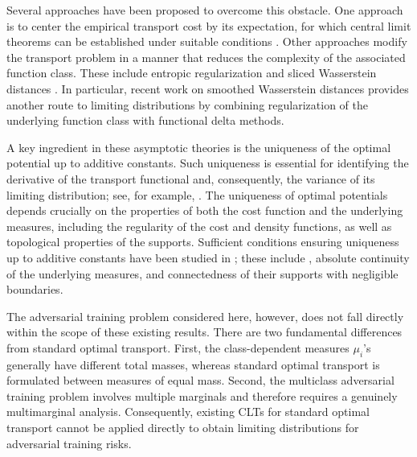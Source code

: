 \documentclass{amsart}
\theoremstyle{plain}
\numberwithin{equation}{section}\newtheorem{theorem}{Theorem}[section]
\theoremstyle{remark}
\begin{document}
Several approaches have been proposed to overcome this obstacle. One approach is to center the empirical transport cost by its expectation, for which central limit theorems can be established under suitable conditions \cite{CLT_OT2019, CLT_general_transport2024, Hundrieser_etc2024}. Other approaches modify the transport problem in a manner that reduces the complexity of the associated function class. These include entropic regularization \cite{CLT_EOT_finite, CLT_general_cost_OT, gonzalezsanz2024weaklimitsentropyregularized, gonzalezsanz2023weaklimitsempiricalentropic, lower_complexity_EOT, limit_distribution_EOT, samplecomplexity_EOT} and sliced Wasserstein distances \cite{Okano_Imaizumi2024, Goldfeld_Kato_Rioux_Sadhu2024, rodriguezvitores2025improvedcentrallimittheorem}. In particular, recent work on smoothed Wasserstein distances \cite{limit_pWasserstein2024, Goldfeld_Kato_Rioux_Sadhu2024} provides another route to limiting distributions by combining regularization of the underlying function class with functional delta methods.





A key ingredient in these asymptotic theories is the uniqueness of the optimal potential up to additive constants. Such uniqueness is essential for identifying the derivative of the transport functional and, consequently, the variance of its limiting distribution; see, for example, \cite{CLT_OT2019, Goldfeld_Kato_Rioux_Sadhu2024, CLT_general_transport2024}. The uniqueness of optimal potentials depends crucially on the properties of both the cost function and the underlying measures, including the regularity of the cost and density functions, as well as topological properties of the supports. Sufficient conditions ensuring uniqueness up to additive constants have been studied in \cite{CLT_OT2019, CLT_general_transport2024}; these include , absolute continuity of the underlying measures, and connectedness of their supports with negligible boundaries.





The adversarial training problem considered here, however, does not fall directly within the scope of these existing results. There are two fundamental differences from standard optimal transport. First, the class-dependent measures $\mu_i$'s generally have different total masses, whereas standard optimal transport is formulated between measures of equal mass. Second, the multiclass adversarial training problem involves multiple marginals and therefore requires a genuinely multimarginal analysis. Consequently, existing CLTs for standard optimal transport cannot be applied directly to obtain limiting distributions for adversarial training risks.
\end{document}
